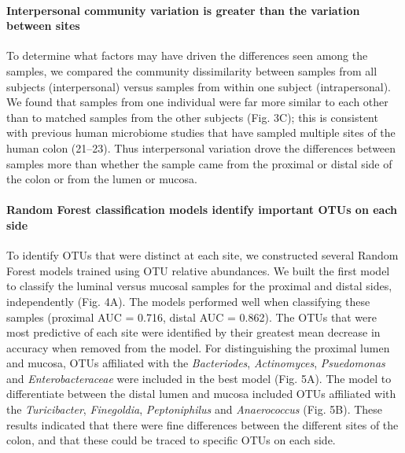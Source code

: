 \documentclass[12pt,]{article}
\let\oldparagraph\paragraph
\renewcommand{\paragraph}[1]{\oldparagraph{#1}\mbox{}}
\begin{document}
\paragraph{Interpersonal community variation is greater than the
variation between
sites}\label{interpersonal-community-variation-is-greater-than-the-variation-between-sites}

To determine what factors may have driven the differences seen among the
samples, we compared the community dissimilarity between samples from
all subjects (interpersonal) versus samples from within one subject
(intrapersonal). We found that samples from one individual were far more
similar to each other than to matched samples from the other subjects
(Fig. 3C); this is consistent with previous human microbiome studies
that have sampled multiple sites of the human colon (21--23). Thus
interpersonal variation drove the differences between samples more than
whether the sample came from the proximal or distal side of the colon or
from the lumen or mucosa.

\paragraph{Random Forest classification models identify important OTUs
on each
side}\label{random-forest-classification-models-identify-important-otus-on-each-side}

To identify OTUs that were distinct at each site, we constructed several
Random Forest models trained using OTU relative abundances. We built the
first model to classify the luminal versus mucosal samples for the
proximal and distal sides, independently (Fig. 4A). The models performed
well when classifying these samples (proximal AUC = 0.716, distal AUC =
0.862). The OTUs that were most predictive of each site were identified
by their greatest mean decrease in accuracy when removed from the model.
For distinguishing the proximal lumen and mucosa, OTUs affiliated with
the \emph{Bacteriodes}, \emph{Actinomyces}, \emph{Psuedomonas} and
\emph{Enterobacteraceae} were included in the best model (Fig. 5A). The
model to differentiate between the distal lumen and mucosa included OTUs
affiliated with the \emph{Turicibacter}, \emph{Finegoldia},
\emph{Peptoniphilus} and \emph{Anaerococcus} (Fig. 5B). These results
indicated that there were fine differences between the different sites
of the colon, and that these could be traced to specific OTUs on each
side.
\end{document}
